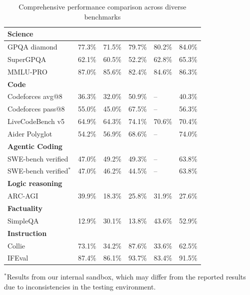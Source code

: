 \begin{table}[h]
\centering
\caption{Comprehensive performance comparison across diverse benchmarks}
\label{tab:comprehensive-results}
\begin{tabular}{p{3cm}p{1.5cm}p{1.5cm}p{1.5cm}p{1.5cm}p{1.5cm}}
\toprule
\multicolumn{6}{p{12cm}}{\textbf{Science}} \\
\hline
GPQA diamond & 77.3\% & 71.5\% & 79.7\% & 80.2\%  & 84.0\% \\
SuperGPQA & 62.1\% & 60.5\% & 52.2\% & 62.8\%  & 65.3\% \\
MMLU-PRO & 87.0\% & 85.6\% & 82.4\% & 84.6\% & 86.3\% \\
\hline
\multicolumn{6}{p{12cm}}{\textbf{Code}} \\
\hline
Codeforces avg@8 & 36.3\% & 32.0\% & 50.9\% & -- & 40.3\% \\
Codeforces pass@8  & 55.0\% & 45.0\% & 67.5\% & -- & 56.3\% \\
LiveCodeBench v5 & 64.9\% & 64.3\% & 74.1\% & 70.6\% & 70.4\% \\
Aider Polyglot & 54.2\% & 56.9\%  &  68.6\% & --  & 74.0\% \\
\hline
\multicolumn{6}{p{12cm}}{\textbf{Agentic Coding}} \\
\hline
SWE-bench verified & 47.0\% & 49.2\% & 49.3\% & --  & 63.8\% \\
SWE-bench verified$^*$ & 47.0\%  & 46.2\% & 44.5\%   & --  & 63.8\% \\
\hline
\multicolumn{6}{p{12cm}}{\textbf{Logic reasoning}} \\
\hline
ARC-AGI & 39.9\% & 18.3\%  & 25.8\% & 31.9\%  & 27.6\% \\
\hline
\multicolumn{6}{p{12cm}}{\textbf{Factuality}} \\
\hline
SimpleQA & 12.9\% & 30.1\% & 13.8\%& 43.6\% & 52.9\% \\
\hline
\multicolumn{6}{p{12cm}}{\textbf{Instruction}} \\
\hline
Collie & 73.1\%  & 34.2\% & 87.6\% & 33.6\% & 62.5\% \\
IFEval & 87.4\% & 86.1\% & 93.7\% & 83.4\% & 91.5\% \\
\bottomrule
\end{tabular}
\end{table}
\begin{flushleft}
$^*$\footnotesize{Results from our internal sandbox, which may differ from the reported results due to inconsistencies in the testing environment.}
\end{flushleft}

